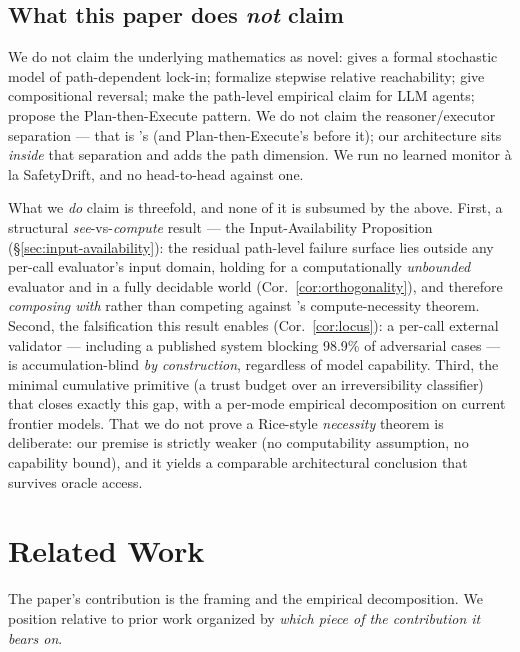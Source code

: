 \documentclass[11pt]{article}
\begin{document}
\subsection{What this paper does \emph{not} claim}
\label{sec:nonclaims}

We do not claim the underlying mathematics as novel: \citet{arthur1989} gives a formal stochastic model of path-dependent lock-in; \citet{krakovna2018} formalize stepwise relative reachability; \citet{garcia1987sagas} give compositional reversal; \citet{dhodapkar2026safetydrift} make the path-level empirical claim for LLM agents; \citet{delrosario2025planex} propose the Plan-then-Execute pattern. We do not claim the reasoner/executor separation --- that is \citet{fokou2026parallax}'s (and Plan-then-Execute's before it); our architecture sits \emph{inside} that separation and adds the path dimension. We run no learned monitor \`a la SafetyDrift, and no head-to-head against one.

What we \emph{do} claim is threefold, and none of it is subsumed by the above. First, a structural \emph{see}-vs-\emph{compute} result --- the Input-Availability Proposition (\S\ref{sec:input-availability}): the residual path-level failure surface lies outside any per-call evaluator's input domain, holding for a computationally \emph{unbounded} evaluator and in a fully decidable world (Cor.~\ref{cor:orthogonality}), and therefore \emph{composing with} rather than competing against \citet{mccann2026governance}'s compute-necessity theorem. Second, the falsification this result enables (Cor.~\ref{cor:locus}): a per-call external validator --- including a published system blocking 98.9\% of adversarial cases --- is accumulation-blind \emph{by construction}, regardless of model capability. Third, the minimal cumulative primitive (a trust budget over an irreversibility classifier) that closes exactly this gap, with a per-mode empirical decomposition on current frontier models. That we do not prove a Rice-style \emph{necessity} theorem is deliberate: our premise is strictly weaker (no computability assumption, no capability bound), and it yields a comparable architectural conclusion that survives oracle access.

\section{Related Work}

The paper's contribution is the framing and the empirical decomposition. We position relative to prior work organized by \emph{which piece of the contribution it bears on}.
\end{document}
